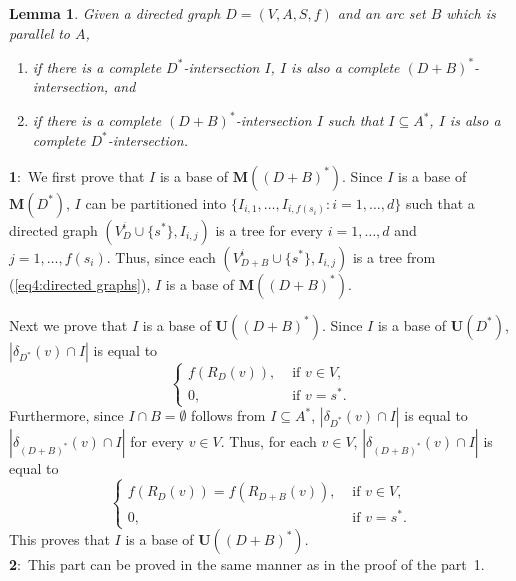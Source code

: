 \documentclass[11pt]{article}
\newcounter{ni}
\theoremstyle{plain}
\newtheorem{lemma}[theorem]{Lemma}\newtheorem{corollary}[theorem]{Corollary}\newtheorem{definition}[theorem]{Definition}\newtheorem{proposition}[theorem]{Proposition}\newtheorem{claim}[theorem]{Claim}\newtheorem{fact}[theorem]{Fact}\newtheorem{example}{Example}
\newcommand{\eop}{\hfill \usebox{\ProofSym}}
\newenvironment{proof}{\noindent {\it Proof.}}{\eop\par\vspace{0.3cm}}
\begin{document}
\begin{lemma} \label{lemma1:wmi}
Given a directed graph  $D=(V,A,S,f)$ and an arc set $B$ which is parallel to $A$,
\begin{enumerate}
\item if there is a complete $D^{\ast}$-intersection $I$, $I$ is also a complete $(D+B)^{\ast}$-intersection, and
\item if there is a complete $(D+B)^{\ast}$-intersection $I$ such that $I\subseteq A^{\ast}$, $I$ 
is also a complete $D^{\ast}$-intersection.  
\end{enumerate}
\end{lemma}
\begin{proof}
{\bf 1$\colon$}
We first prove that $I$ is a base of $\bm{M}((D+B)^{\ast})$. 
Since $I$ is a base of $\bm{M}(D^{\ast})$, $I$ can be partitioned into $\{I_{i,1},\ldots,I_{i,f(s_i)}\colon i=1,\ldots,d\}$
such that a directed graph $(V_D^i\cup \{s^{\ast}\},I_{i,j})$ is a tree for every 
$i=1,\ldots,d$ and $j=1,\ldots,f(s_i)$.
Thus, since each $(V^i_{D+B}\cup \{s^{\ast}\},I_{i,j})$ is a tree from (\ref{eq4:directed graphs}),
$I$ is a base of $\bm{M}((D+B)^{\ast})$. 

Next we prove that $I$ is a base of $\bm{U}((D+B)^{\ast})$. 
Since $I$ is a base of $\bm{U}(D^{\ast})$,
$|\delta_{D^{\ast}}(v)\cap I|$ is equal to 
\begin{equation*}
\left\{
\begin{array}{ll}
f(R_D(v)), & \mbox{ if } v \in V,\\
0, & \mbox{ if } v=s^{\ast}.
\end{array}
\right.
\end{equation*}
Furthermore, since $I\cap B =\emptyset$ follows from $I\subseteq A^{\ast}$, 
$|\delta_{D^{\ast}}(v)\cap I|$ is equal to $|\delta_{(D+B)^{\ast}}(v)\cap I|$ for every $v \in V$. 
Thus, for each $v\in V$, $|\delta_{(D+B)^{\ast}}(v)\cap I|$ is equal to 
\begin{equation}
\left\{
\begin{array}{ll}
f(R_D(v)) = f(R_{D+B}(v)), & \mbox{ if } v \in V,\\
0, & \mbox{ if } v = s^{\ast}.
\end{array}
\right.
\end{equation}
This proves that $I$ is a base of $\bm{U}((D+B)^{\ast})$.  
\\
{\bf 2$\colon$}
This part can be proved in the same manner as in the proof of the part~1.  
\hfill\usebox{\ProofSym}
\end{proof}
\end{document}
